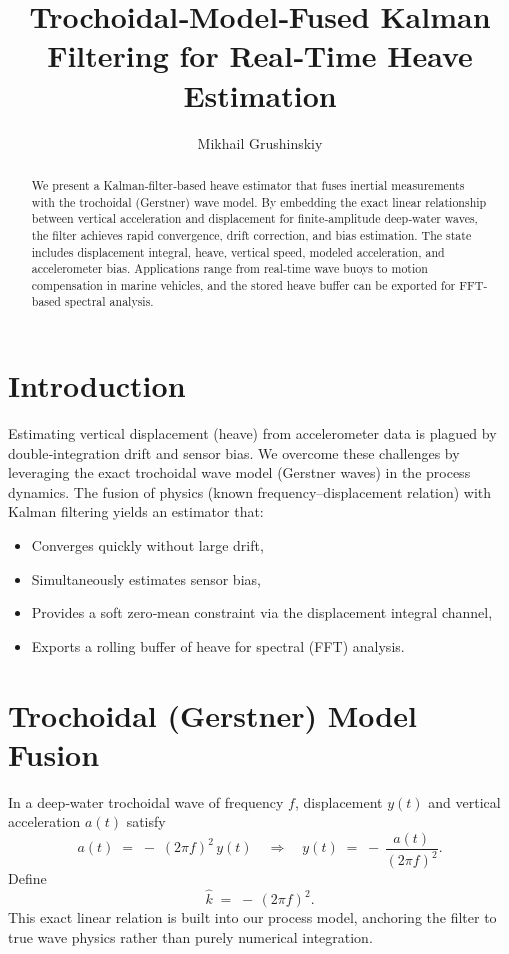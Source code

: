 \documentclass[12pt]{article}
\title{Trochoidal‐Model‐Fused Kalman Filtering for Real‐Time Heave Estimation}
\author{Mikhail Grushinskiy}
\affil{Independent Researcher, 2025}
\begin{document}
\maketitle

\begin{abstract}
We present a Kalman‐filter‐based heave estimator that fuses inertial measurements with the trochoidal (Gerstner) wave model.  By embedding the exact linear relationship between vertical acceleration and displacement for finite‐amplitude deep‐water waves, the filter achieves rapid convergence, drift correction, and bias estimation.  The state includes displacement integral, heave, vertical speed, modeled acceleration, and accelerometer bias.  Applications range from real‐time wave buoys to motion compensation in marine vehicles, and the stored heave buffer can be exported for FFT‐based spectral analysis.
\end{abstract}

\section{Introduction}
Estimating vertical displacement (heave) from accelerometer data is plagued by double‐integration drift and sensor bias.  We overcome these challenges by leveraging the exact trochoidal wave model (Gerstner waves) in the process dynamics.  The fusion of physics (known frequency–displacement relation) with Kalman filtering yields an estimator that:
\begin{itemize}
  \item Converges quickly without large drift,
  \item Simultaneously estimates sensor bias,
  \item Provides a soft zero‐mean constraint via the displacement integral channel,
  \item Exports a rolling buffer of heave for spectral (FFT) analysis.
\end{itemize}

\section{Trochoidal (Gerstner) Model Fusion}
In a deep‐water trochoidal wave of frequency \(f\), displacement \(y(t)\) and vertical acceleration \(a(t)\) satisfy
\[
a(t) \;=\; -\;(2\pi f)^2\,y(t)\quad\Longrightarrow\quad
y(t) \;=\; -\,\frac{a(t)}{(2\pi f)^2}.
\]
Define
\[
\hat{k} \;=\; -\,(2\pi f)^2.
\]
This exact linear relation is built into our process model, anchoring the filter to true wave physics rather than purely numerical integration.
\end{document}
